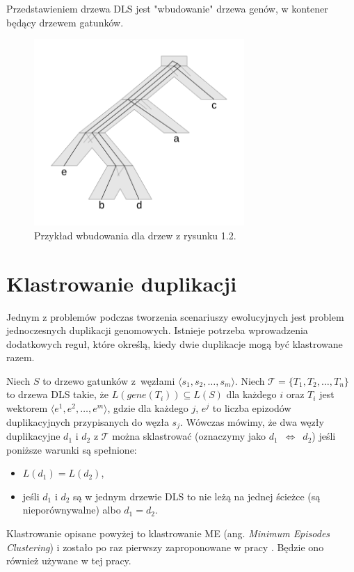 \documentclass[licencjacka]{pracamgr}
\begin{document}
Przedstawieniem drzewa DLS jest "wbudowanie" drzewa genów, w kontener będący drzewem gatunków. 


\begin{figure}[H]
  \centering
  \includegraphics[width=80mm]{./pictures/optscen.png}
  \caption{Przykład wbudowania dla drzew z rysunku 1.2.}
\end{figure}

\section{Klastrowanie duplikacji}

Jednym z problemów podczas tworzenia scenariuszy ewolucyjnych jest problem jednoczesnych duplikacji genomowych. Istnieje potrzeba wprowadzenia dodatkowych reguł, które określą, kiedy dwie duplikacje mogą być klastrowane razem. 
 
Niech $S$ to drzewo gatunków z~węzłami $\langle s_1,s_2, \dots , s_m \rangle$.
Niech $\mathcal{T}=\{T_1,T_2, \dots , T_n\}$ to drzewa DLS takie, że $L(gene(T_i)) \subseteq L(S)$ dla każdego $i$ oraz $T_i$ jest wektorem $\langle e^1,e^2, \dots , e^m \rangle$, gdzie dla każdego $j$, $e^j$ to liczba epizodów duplikacyjnych przypisanych do węzła $s_j$. Wówczas mówimy, że dwa węzły duplikacyjne $d_1$ i $d_2$ z $\mathcal{T}$ można sklastrować (oznaczymy jako $d_1$~$\Longleftrightarrow$~$d_2$)  jeśli poniższe warunki są spełnione:
\begin{itemize}
\item $L(d_1) = L({d_2})$,
\item jeśli $d_1$ i $d_2$ są w jednym drzewie DLS to nie leżą na jednej ścieżce (są nieporównywalne) albo $d_1=d_2$.
\end{itemize}

Klastrowanie opisane powyżej to klastrowanie ME (ang. \textit{Minimum Episodes Clustering}) i zostało po raz pierwszy zaproponowane w pracy \cite{Guigo1996}. Będzie ono również używane w tej pracy.
\end{document}
